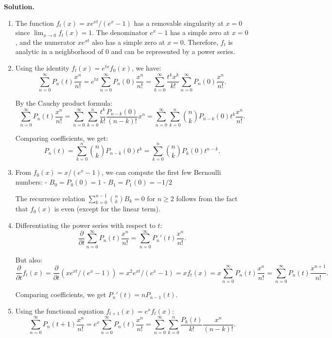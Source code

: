 \noindent\textbf{Solution.}
\begin{enumerate}[label=(\alph*)]
\item The function \( f_t(x) = xe^{xt}/(e^x - 1) \) has a removable singularity at \( x = 0 \) since \( \lim_{x \to 0} f_t(x) = 1 \). The denominator \( e^x - 1 \) has a simple zero at \( x = 0 \), and the numerator \( xe^{xt} \) also has a simple zero at \( x = 0 \). Therefore, \( f_t \) is analytic in a neighborhood of 0 and can be represented by a power series.

\item Using the identity \( f_t(x) = e^{tx} f_0(x) \), we have:
\[\sum_{n=0}^\infty P_n(t) \frac{x^n}{n!} = e^{tx} \sum_{n=0}^\infty P_n(0) \frac{x^n}{n!} = \sum_{k=0}^\infty \frac{t^k x^k}{k!} \sum_{n=0}^\infty P_n(0) \frac{x^n}{n!}.\]

By the Cauchy product formula:
\[\sum_{n=0}^\infty P_n(t) \frac{x^n}{n!} = \sum_{n=0}^\infty \sum_{k=0}^n \frac{t^k}{k!} \frac{P_{n-k}(0)}{(n-k)!} x^n = \sum_{n=0}^\infty \sum_{k=0}^n \binom{n}{k} P_{n-k}(0) t^k \frac{x^n}{n!}.\]

Comparing coefficients, we get:
\[P_n(t) = \sum_{k=0}^n \binom{n}{k} P_{n-k}(0) t^k = \sum_{k=0}^n \binom{n}{k} P_k(0) t^{n-k}.\]

\item From \( f_0(x) = x/(e^x - 1) \), we can compute the first few Bernoulli numbers:
- \( B_0 = P_0(0) = 1 \)
- \( B_1 = P_1(0) = -1/2 \)

The recurrence relation \( \sum_{k=0}^{n-1} \binom{n}{k} B_k = 0 \) for \( n \geq 2 \) follows from the fact that \( f_0(x) \) is even (except for the linear term).

\item Differentiating the power series with respect to \( t \):
\[\frac{\partial}{\partial t} \sum_{n=0}^\infty P_n(t) \frac{x^n}{n!} = \sum_{n=0}^\infty P_n'(t) \frac{x^n}{n!}.\]

But also:
\[\frac{\partial}{\partial t} f_t(x) = \frac{\partial}{\partial t} (xe^{xt}/(e^x - 1)) = x^2 e^{xt}/(e^x - 1) = x f_t(x) = x \sum_{n=0}^\infty P_n(t) \frac{x^n}{n!} = \sum_{n=0}^\infty P_n(t) \frac{x^{n+1}}{n!}.\]

Comparing coefficients, we get \( P_n'(t) = nP_{n-1}(t) \).

\item Using the functional equation \( f_{t+1}(x) = e^x f_t(x) \):
\[\sum_{n=0}^\infty P_n(t+1) \frac{x^n}{n!} = e^x \sum_{n=0}^\infty P_n(t) \frac{x^n}{n!} = \sum_{n=0}^\infty \sum_{k=0}^n \frac{P_k(t)}{k!} \frac{x^n}{(n-k)!}.\]


\end{enumerate}
